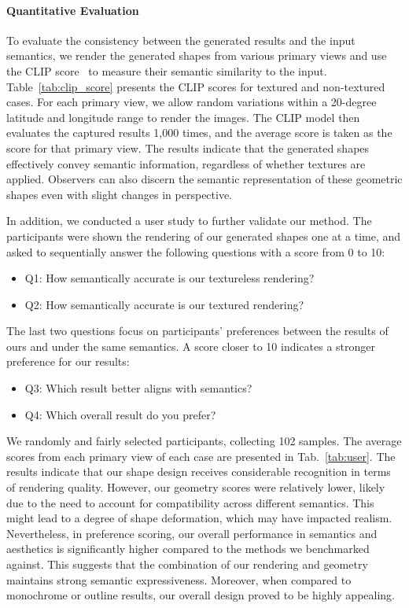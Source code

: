 \paragraph{Quantitative Evaluation}
To evaluate the consistency between the generated results and the input semantics, we render the generated shapes from various primary views and use the CLIP score~\cite{clip} to measure their semantic similarity to the input. Table~\ref{tab:clip_score} presents the CLIP scores for textured and non-textured cases. For each primary view, we allow random variations within a 20-degree latitude and longitude range to render the images. The CLIP model then evaluates the captured results 1,000 times, and the average score is taken as the score for that primary view. The results indicate that the generated shapes effectively convey semantic information, regardless of whether textures are applied. Observers can also discern the semantic representation of these geometric shapes even with slight changes in perspective.


In addition, we conducted a user study to further validate our method. The participants were shown the rendering of our generated shapes one at a time, and asked to sequentially answer the following questions with a score from 0 to 10:
\begin{itemize}[leftmargin=*]
\item Q1: How semantically accurate is our textureless rendering?
\item Q2: How semantically accurate is our textured rendering?
\end{itemize}
The last two questions focus on participants' preferences between the results of ours and \cite{Fabricable3DWireArt} under the same semantics. A score closer to 10 indicates a stronger preference for our results:
\begin{itemize}[leftmargin=*]
\item Q3: Which result better aligns with semantics? 
\item Q4: Which overall result do you prefer? 
\end{itemize}
We randomly and fairly selected participants, collecting 102 samples. The average scores from each primary view of each case are presented in Tab.~\ref{tab:user}. The results indicate that our shape design receives considerable recognition in terms of rendering quality. However, our geometry scores were relatively lower, likely due to the need to account for compatibility across different semantics. This might lead to a degree of shape deformation, which may have impacted realism. Nevertheless, in preference scoring, our overall performance in semantics and aesthetics is significantly higher compared to the methods we benchmarked against. This suggests that the combination of our rendering and geometry maintains strong semantic expressiveness. Moreover, when compared to monochrome or outline results, our overall design proved to be highly appealing.

